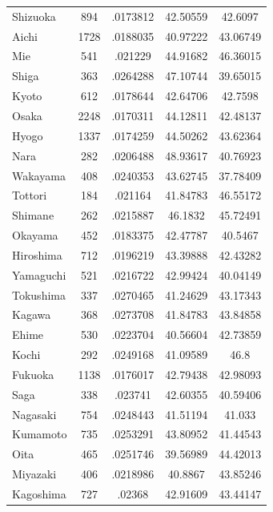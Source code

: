 \begin{tabular}{l*{4}{c}}
Shizuoka    &         894&    .0173812&    42.50559&     42.6097\\
Aichi       &        1728&    .0188035&    40.97222&    43.06749\\
Mie         &         541&     .021229&    44.91682&    46.36015\\
Shiga       &         363&    .0264288&    47.10744&    39.65015\\
Kyoto       &         612&    .0178644&    42.64706&     42.7598\\
Osaka       &        2248&    .0170311&    44.12811&    42.48137\\
Hyogo       &        1337&    .0174259&    44.50262&    43.62364\\
Nara        &         282&    .0206488&    48.93617&    40.76923\\
Wakayama    &         408&    .0240353&    43.62745&    37.78409\\
Tottori     &         184&     .021164&    41.84783&    46.55172\\
Shimane     &         262&    .0215887&     46.1832&    45.72491\\
Okayama     &         452&    .0183375&    42.47787&     40.5467\\
Hiroshima   &         712&    .0196219&    43.39888&    42.43282\\
Yamaguchi   &         521&    .0216722&    42.99424&    40.04149\\
Tokushima   &         337&    .0270465&    41.24629&    43.17343\\
Kagawa      &         368&    .0273708&    41.84783&    43.84858\\
Ehime       &         530&    .0223704&    40.56604&    42.73859\\
Kochi       &         292&    .0249168&    41.09589&        46.8\\
Fukuoka     &        1138&    .0176017&    42.79438&    42.98093\\
Saga        &         338&     .023741&    42.60355&    40.59406\\
Nagasaki    &         754&    .0248443&    41.51194&      41.033\\
Kumamoto    &         735&    .0253291&    43.80952&    41.44543\\
Oita        &         465&    .0251746&    39.56989&    44.42013\\
Miyazaki    &         406&    .0218986&     40.8867&    43.85246\\
Kagoshima   &         727&      .02368&    42.91609&    43.44147\\
\hline\hline
\end{tabular}
